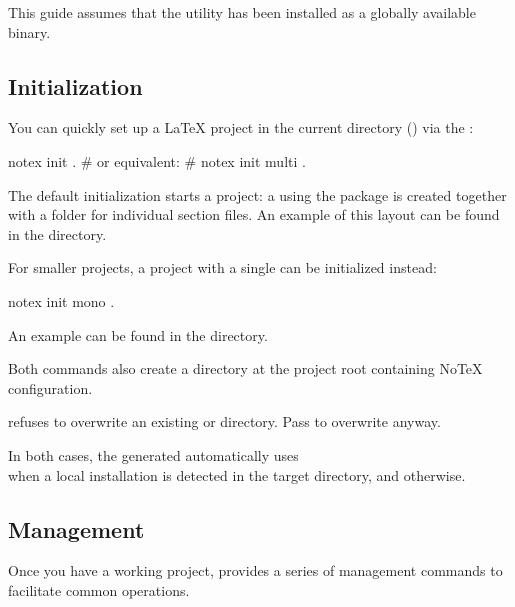 \documentclass[../main.tex]{subfiles}
\begin{document}
\begin{info}
    This guide assumes that the  utility has been installed as a globally available binary.
\end{info}

\subsection{Initialization}

You can quickly set up a \LaTeX{} project in the current directory () via the :

\begin{bash}
    notex init .
    # or equivalent:
    # notex init multi .
\end{bash}

The default initialization starts a  project: a  using the  package is created together with a  folder for individual section files.
An example of this layout can be found in the  directory.

For smaller projects, a  project with a single  can be initialized instead:

\begin{bash}
    notex init mono .
\end{bash}

An example can be found in the  directory.

Both commands also create a  directory at the project root containing NoTeX configuration.

\begin{info}
     refuses to overwrite an existing  or  directory.
    Pass  to overwrite anyway.
\end{info}

In both cases, the generated  automatically uses\\
  when a local installation is detected in the target directory, and  otherwise.

\subsection{Management}

Once you have a working project,  provides a series of management commands to facilitate common operations.
\end{document}
